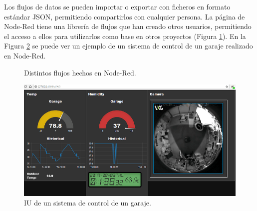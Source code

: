 Los flujos de datos se pueden importar o exportar con ficheros en formato estándar JSON, permitiendo compartirlos con cualquier persona. La página de Node-Red tiene una librería de flujos que han creado otros usuarios, permitiendo el acceso a ellos para utilizarlos como base en otros proyectos (Figura \ref{fig:flujos}). En la Figura \ref{fig:ui-internet} se puede ver un ejemplo de un sistema de control de un garaje realizado en Node-Red.\\
\begin{figure}[h!]
  \begin{center}
    \hspace{2mm}
  \end{center}
\caption{Distintos flujos hechos en Node-Red.} \label{fig:flujos}
\end{figure}
\begin{figure} [h!]
  \begin{center}
    \includegraphics[width=15cm]{figs/ui-internet}
  \end{center}
  \caption{IU de un sistema de control de un garaje.}
  \label{fig:ui-internet}
\end{figure}

